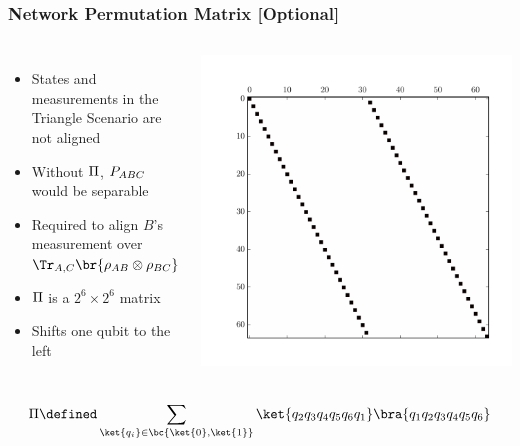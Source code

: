 \documentclass[
    hyperref={bookmarks=false},%
    xcolor={dvipsnames},
]{beamer}
\begin{document}
\begin{frame}
    \frametitle{Network Permutation Matrix [Optional]}
    \begin{columns}
        \begin{itemize}
            \item States and measurements in the Triangle Scenario are not aligned
            \item Without $\Pi$, $\prob[ABC]$ would be separable
            \item Required to align $B$'s measurement over $\Tr_{A,C}\br{\rho_{AB} \otimes \rho_{BC}}$
            \item $\Pi$ is a $2^6 \times 2^6$ matrix
            \item Shifts one qubit to the left
        \end{itemize}
            \includegraphics[trim={1.0cm 1.2cm 1.0cm 1cm},clip,width=1.0\textwidth]{../../figures/perm_mtrx.pdf}
    \end{columns}
    \[ \netperm \defined \sum_{\ket{q_i} \in \bc{\ket{0}, \ket{1}}}\ket{q_2q_3q_4q_5q_6q_1}\bra{q_1q_2q_3q_4q_5q_6} \]
\end{frame}
\end{document}
